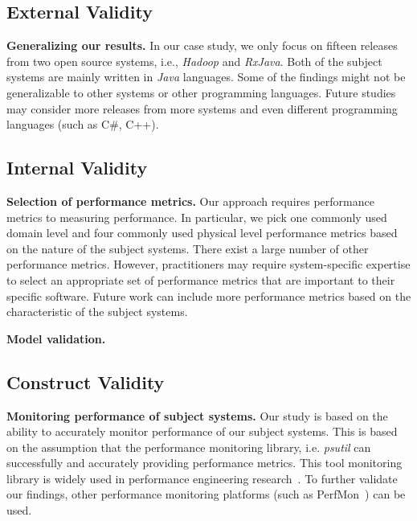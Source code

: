 \subsection{External Validity}

\textbf{Generalizing our results. }In our case study, we only focus on fifteen releases from two open source systems, i.e., \emph{Hadoop} and \emph{RxJava}. Both of the subject systems are mainly written in \emph{Java} languages. Some of the findings might not be generalizable to other systems or other programming languages. Future studies may consider more releases from more systems and even different programming languages (such as C\#, C++). 

\subsection{Internal Validity}

\textbf{Selection of performance metrics.} Our approach requires performance metrics to measuring performance. In particular, we pick one commonly used domain level and four commonly used physical level performance metrics based on the nature of the subject systems. There exist a large number of other performance metrics. However, practitioners may require system-specific expertise to select an appropriate set of performance metrics that are important to their specific software. Future work can include more performance metrics based on the characteristic of the subject systems. 

\textbf{Model validation.}

\subsection{Construct Validity}

\textbf{Monitoring performance of subject systems.} Our study is based on the ability to accurately monitor performance of our subject systems. This is based on the assumption that the performance monitoring library, i.e. \emph{psutil} can successfully and accurately providing performance metrics. This tool monitoring library is widely used in performance engineering research~\cite{peterfse,tarekmsr16}. To further validate our findings, other performance monitoring platforms (such as PerfMon~\cite{perfmon}) can be used. 



